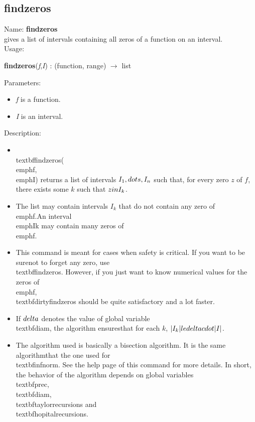 \subsection{findzeros}
\label{labfindzeros}
\noindent Name: \textbf{findzeros}\\
gives a list of intervals containing all zeros of a function on an interval.\\
\noindent Usage: 
\begin{center}
\textbf{findzeros}(\emph{f},\emph{I}) : (\textsf{function}, \textsf{range}) $\rightarrow$ \textsf{list}\\
\end{center}
Parameters: 
\begin{itemize}
\item \emph{f} is a function.
\item \emph{I} is an interval.
\end{itemize}
\noindent Description: \begin{itemize}

\item \\textbf{findzeros}(\\emph{f},\\emph{I}) returns a list of intervals $I_1, \\dots, I_n$ such that, for \n   every zero $z$ of $f$, there exists some $k$ such that $z \\in I_k$.\n
\item The list may contain intervals $I_k$ that do not contain any zero of \\emph{f}.\n   An interval \\emph{Ik} may contain many zeros of \\emph{f}.\n
\item This command is meant for cases when safety is critical. If you want to be sure\n   not to forget any zero, use \\textbf{findzeros}. However, if you just want to know \n   numerical values for the zeros of \\emph{f}, \\textbf{dirtyfindzeros} should be quite \n   satisfactory and a lot faster.\n
\item If $\\delta$ denotes the value of global variable \\textbf{diam}, the algorithm ensures\n   that for each $k$, $|I_k| \\le \\delta \\cdot |I|$.\n
\item The algorithm used is basically a bisection algorithm. It is the same algorithm\n   that the one used for \\textbf{infnorm}. See the help page of this command for more \n   details. In short, the behavior of the algorithm depends on global variables\n   \\textbf{prec}, \\textbf{diam}, \\textbf{taylorrecursions} and \\textbf{hopitalrecursions}.\n\end{itemize}
